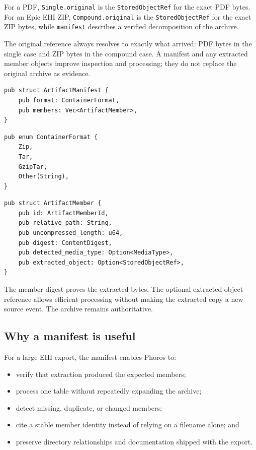 \documentclass[11pt]{article}
\newcommand{\code}[1]{\texttt{#1}}
\begin{document}
For a PDF, \code{Single.original} is the \code{StoredObjectRef} for the exact PDF bytes. For an Epic EHI ZIP, \code{Compound.original} is the \code{StoredObjectRef} for the exact ZIP bytes, while \code{manifest} describes a verified decomposition of the archive.

\begin{decisionbox}
The original reference always resolves to exactly what arrived: PDF bytes in the single case and ZIP bytes in the compound case. A manifest and any extracted member objects improve inspection and processing; they do not replace the original archive as evidence.
\end{decisionbox}

\begin{lstlisting}
pub struct ArtifactManifest {
    pub format: ContainerFormat,
    pub members: Vec<ArtifactMember>,
}
\end{lstlisting}

\Needspace{0.18\textheight}
\begin{lstlisting}
pub enum ContainerFormat {
    Zip,
    Tar,
    GzipTar,
    Other(String),
}
\end{lstlisting}

\Needspace{0.28\textheight}
\begin{lstlisting}
pub struct ArtifactMember {
    pub id: ArtifactMemberId,
    pub relative_path: String,
    pub uncompressed_length: u64,
    pub digest: ContentDigest,
    pub detected_media_type: Option<MediaType>,
    pub extracted_object: Option<StoredObjectRef>,
}
\end{lstlisting}

The member digest proves the extracted bytes. The optional extracted-object reference allows efficient processing without making the extracted copy a new source event. The archive remains authoritative.

\subsection{Why a manifest is useful}

For a large EHI export, the manifest enables Phoros to:

\begin{itemize}
  \item verify that extraction produced the expected members;
  \item process one table without repeatedly expanding the archive;
  \item detect missing, duplicate, or changed members;
  \item cite a stable member identity instead of relying on a filename alone; and
  \item preserve directory relationships and documentation shipped with the export.
\end{itemize}
\end{document}
